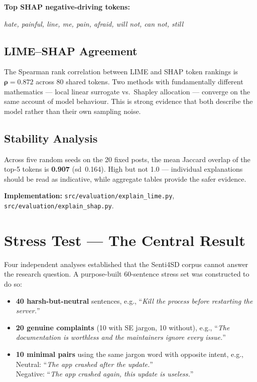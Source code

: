 \documentclass[11pt,a4paper]{article}
\begin{document}
\textbf{Top SHAP negative-driving tokens:}
\begin{center}
\textit{hate, painful, line, me, pain, afraid, will not, can not, still}
\end{center}

\subsection{LIME--SHAP Agreement}

The Spearman rank correlation between LIME and SHAP token rankings is $\boldsymbol{\rho = 0.872}$ across 80 shared tokens. Two methods with fundamentally different mathematics --- local linear surrogate vs.\ Shapley allocation --- converge on the same account of model behaviour. This is strong evidence that both describe the model rather than their own sampling noise.

\subsection{Stability Analysis}

Across five random seeds on the 20 fixed posts, the mean Jaccard overlap of the top-5 tokens is \textbf{0.907} (sd~0.164). High but not 1.0 --- individual explanations should be read as indicative, while aggregate tables provide the safer evidence.

\textbf{Implementation:} \texttt{src/evaluation/explain\_lime.py}, \texttt{src/evaluation/explain\_shap.py}.

\section{Stress Test --- The Central Result}
\label{sec:stress}

Four independent analyses established that the Senti4SD corpus cannot answer the research question. A purpose-built 60-sentence stress set was constructed to do so:

\begin{itemize}[leftmargin=*]
    \item \textbf{40 harsh-but-neutral} sentences, e.g., ``\textit{Kill the process before restarting the server.}''
    \item \textbf{20 genuine complaints} (10 with SE jargon, 10 without), e.g., ``\textit{The documentation is worthless and the maintainers ignore every issue.}''
    \item \textbf{10 minimal pairs} using the same jargon word with opposite intent, e.g.,\\
    Neutral: ``\textit{The app crashed after the update.}''\\
    Negative: ``\textit{The app crashed again, this update is useless.}''
\end{itemize}
\end{document}
